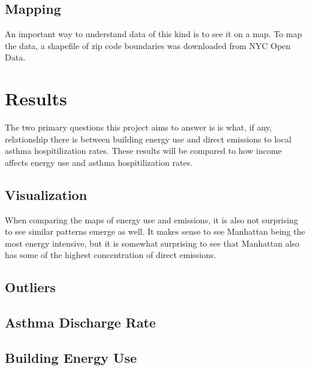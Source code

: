 \documentclass[conference]{IEEEtran}
\begin{document}
\subsection{Mapping}
An important way to understand data of this kind is to see it on a map.
To map the data, a shapefile of zip code boundaries was downloaded from NYC Open Data.

\section{Results}
The two primary questions this project aims to answer is is what, if any, relationship there is between
building energy use and direct emissions to local asthma hospitilization rates. These results
will be compared to how income affects energy use and asthma hospitilization rates.

\subsection{Visualization}

When comparing the maps of energy use and emissions, it is also not surprising to see
similar patterns emerge as well. It makes sense to see Manhattan being the most energy
intensive, but it is somewhat surprising to see that Manhattan also has some of the highest
concentration of direct emissions.


\subsection{Outliers}

\subsection{Asthma Discharge Rate}


\subsection{Building Energy Use}
\end{document}
